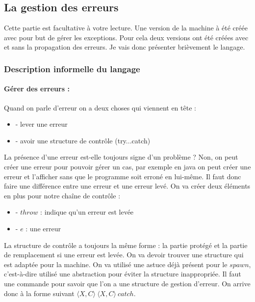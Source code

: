 \documentclass[10pt,a4paper]{article}
\begin{document}
	
	
			\subsection{La gestion des erreurs}
	
				Cette partie est facultative à votre lecture. Une version de la machine à été créée avec pour but de gérer les exceptions. Pour cela deux versions ont été créées avec et sans la propagation des erreurs. Je vais donc présenter brièvement le langage.
				
				\subsubsection{Description informelle du langage}
					
					\paragraph{Gérer des erreurs :} Quand on parle d'erreur on a deux choses qui viennent en tête :
					\begin{itemize}
						\item[] - lever une erreur
						\item[] - avoir une structure de contrôle (try...catch)
					\end{itemize}
					La présence d'une erreur est-elle toujours signe d'un problème ? Non, on peut créer une erreur pour pouvoir gérer un cas, par exemple en java on peut créer une erreur et l'afficher sans que le programme soit erroné en lui-même. Il faut donc faire une différence entre une erreur et une erreur levé. On va créer deux éléments en plus pour notre chaîne de contrôle :
					\begin{itemize}
						\item[] - $throw$ : indique qu'un erreur est levée
						\item[] - $e$ : une erreur
					\end{itemize} 
					La structure de contrôle a toujours la même forme : la partie protégé et la partie de remplacement si une erreur est levée. On va devoir trouver une structure qui est adaptée pour la machine. On va utilisé une astuce déjà présent pour le $spawn$, c'est-à-dire utilisé une abstraction pour éviter la structure inappropriée. Il faut une commande pour savoir que l'on a une structure de gestion d'erreur. On arrive donc à la forme suivant $\langle X,C\rangle~\langle X,C\rangle~catch$.
					\medbreak
					
\end{document}
